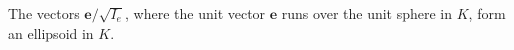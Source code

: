The vectors $\mathbf{e}/\sqrt{I_e}$, where the unit vector $\mathbf{e}$ runs over the unit sphere in $K$, form an ellipsoid in $K$.

